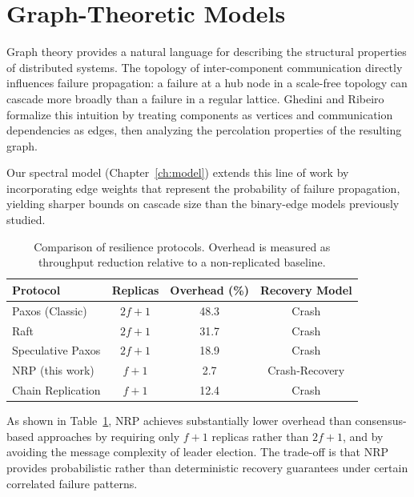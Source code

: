 \section{Graph-Theoretic Models}

Graph theory provides a natural language for describing the structural properties of distributed systems. The topology of inter-component communication directly influences failure propagation: a failure at a hub node in a scale-free topology can cascade more broadly than a failure in a regular lattice. Ghedini and Ribeiro \cite{ghedini2011} formalize this intuition by treating components as vertices and communication dependencies as edges, then analyzing the percolation properties of the resulting graph.

Our spectral model (Chapter~\ref{ch:model}) extends this line of work by incorporating edge weights that represent the probability of failure propagation, yielding sharper bounds on cascade size than the binary-edge models previously studied.

\begin{table}[htbp]
\centering
\caption{Comparison of resilience protocols. Overhead is measured as throughput reduction relative to a non-replicated baseline.}
\label{tab:comparison}
\begin{tabular}{@{}lccc@{}}
\toprule
\textbf{Protocol} & \textbf{Replicas} & \textbf{Overhead (\%)} & \textbf{Recovery Model} \\
\midrule
Paxos (Classic)            & $2f+1$ & 48.3  & Crash           \\{}
Raft                       & $2f+1$ & 31.7  & Crash           \\{}
Speculative Paxos          & $2f+1$ & 18.9  & Crash           \\{}
NRP (this work)            & $f+1$  & 2.7   & Crash-Recovery  \\{}
Chain Replication          & $f+1$  & 12.4  & Crash           \\
\bottomrule
\end{tabular}
\end{table}

As shown in Table~\ref{tab:comparison}, NRP achieves substantially lower overhead than consensus-based approaches by requiring only $f+1$ replicas rather than $2f+1$, and by avoiding the message complexity of leader election. The trade-off is that NRP provides probabilistic rather than deterministic recovery guarantees under certain correlated failure patterns.

